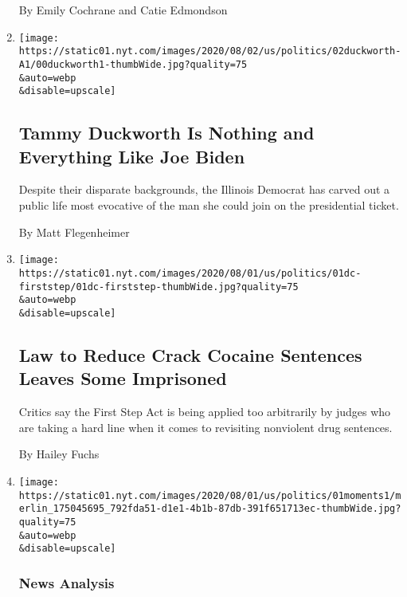 \begin{enumerate}
  By Emily Cochrane and Catie Edmondson
\item
  \href{/2020/08/01/us/politics/tammy-duckworth-biden-vp.html}{}

  \texttt{[image: https://static01.nyt.com/images/2020/08/02/us/politics/02duckworth-A1/00duckworth1-thumbWide.jpg?quality=75\\\&auto=webp\\\&disable=upscale]}

  \hypertarget{tammy-duckworth-is-nothing-and-everything-like-joe-biden-1}{%
  \subsection{Tammy Duckworth Is Nothing and Everything Like Joe
  Biden}\label{tammy-duckworth-is-nothing-and-everything-like-joe-biden-1}}

  Despite their disparate backgrounds, the Illinois Democrat has carved
  out a public life most evocative of the man she could join on the
  presidential ticket.

  By Matt Flegenheimer
\item
  \href{/2020/08/01/us/politics/law-to-reduce-crack-cocaine-sentences-leaves-some-imprisoned.html}{}

  \texttt{[image: https://static01.nyt.com/images/2020/08/01/us/politics/01dc-firststep/01dc-firststep-thumbWide.jpg?quality=75\\\&auto=webp\\\&disable=upscale]}

  \hypertarget{law-to-reduce-crack-cocaine-sentences-leaves-some-imprisoned}{%
  \subsection{Law to Reduce Crack Cocaine Sentences Leaves Some
  Imprisoned}\label{law-to-reduce-crack-cocaine-sentences-leaves-some-imprisoned}}

  Critics say the First Step Act is being applied too arbitrarily by
  judges who are taking a hard line when it comes to revisiting
  nonviolent drug sentences.

  By Hailey Fuchs
\item
  \href{/2020/08/01/us/politics/trump-biden-polls-vp.html}{}

  \texttt{[image: https://static01.nyt.com/images/2020/08/01/us/politics/01moments1/merlin\_175045695\_792fda51-d1e1-4b1b-87db-391f651713ec-thumbWide.jpg?quality=75\\\&auto=webp\\\&disable=upscale]}

  \hypertarget{news-analysis-2}{%
  \subsubsection{News Analysis}\label{news-analysis-2}}


\end{enumerate}
